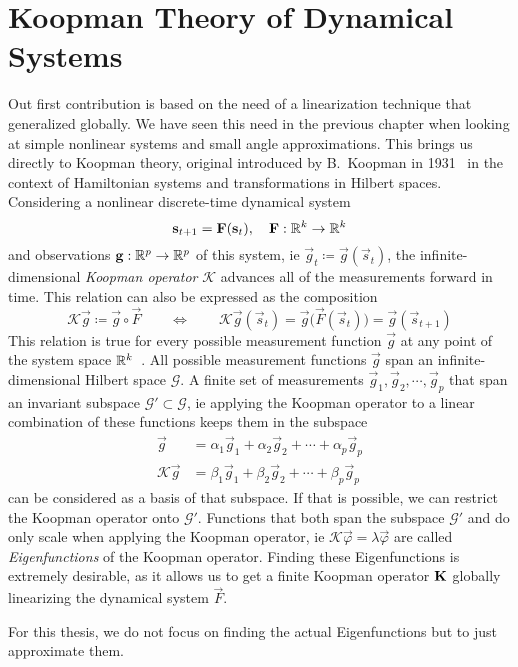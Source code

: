 \chapter{Koopman Theory of Dynamical Systems}
\label{c:koopmanTheoryOfDynamicalSystems}




Out first contribution is based on the need of a linearization technique that generalized globally. We have seen this need in the previous chapter when looking at simple nonlinear systems and small angle approximations. This brings us directly to Koopman theory, original introduced by B.~Koopman in 1931~\cite{koopmanHamiltonianSystemsTransformation1931} in the context of Hamiltonian systems and transformations in Hilbert spaces. Considering a nonlinear discrete-time dynamical system
\begin{equation*}
	\boldsymbol{\mathrm{s}}_{t + 1} = \boldsymbol{\mathrm{F}}(\boldsymbol{\mathrm{s}}_t),\quad \boldsymbol{\mathrm{F}} : \mathbb{R}^k \to \mathbb{R}^k
\end{equation*}
and observations \( \boldsymbol{\mathrm{g}} : \mathbb{R}^p \to \mathbb{R}^p \) of this system, \ac{ie} \( \vec{g}_t \coloneqq \vec{g}(\vec{s}_t) \), the infinite-dimensional \emph{Koopman operator} \(\mathcal{K}\) advances all of the measurements forward in time. This relation can also be expressed as the composition
\begin{equation*}
	\mathcal{K} \vec{g} \coloneqq \vec{g} \circ \vec{F} \qquad\iff\qquad \mathcal{K} \vec{g}(\vec{s}_t) = \vec{g}\big( \vec{F}(\vec{s}_t) \big) = \vec{g}(\vec{s}_{t + 1})
\end{equation*}
This relation is true for every possible measurement function \( \vec{g} \) at any point of the system space \( \mathbb{R}^k \)~\cite{bruntonKoopmanInvariantSubspaces2016}. All possible measurement functions \( \vec{g} \) span an infinite-dimensional Hilbert space \( \mathcal{G} \). A finite set of measurements \( \vec{g}_1, \vec{g}_2, \cdots, \vec{g}_p \) that span an invariant subspace \( \mathcal{G}' \subset \mathcal{G} \), \ac{ie} applying the Koopman operator to a linear combination of these functions keeps them in the subspace
\begin{align*}
	\vec{g} &= \alpha_1 \vec{g}_1 + \alpha_2 \vec{g}_2 + \cdots + \alpha_p \vec{g}_p \\
	\mathcal{K} \vec{g} &= \beta_1 \vec{g}_1 + \beta_2 \vec{g}_2 + \cdots + \beta_p \vec{g}_p
\end{align*}
can be considered as a basis of that subspace. If that is possible, we can restrict the Koopman operator onto \( \mathcal{G}' \). Functions that both span the subspace \(\mathcal{G}'\) and do only scale when applying the Koopman operator, \ac{ie} \( \mathcal{K} \vec{\varphi} = \lambda \vec{\varphi} \) are called \emph{Eigenfunctions} of the Koopman operator. Finding these Eigenfunctions is extremely desirable, as it allows us to get a finite Koopman operator \( \boldsymbol{\mathrm{K}} \) globally linearizing the dynamical system \( \vec{F} \).

For this thesis, we do not focus on finding the actual Eigenfunctions but to just approximate them.
